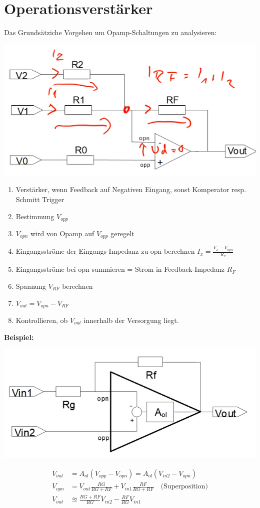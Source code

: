 \section{Operationsverstärker}
Das Grundsätziche Vorgehen um Opamp-Schaltungen zu analysieren:
\begin{center}
	\includegraphics[width=0.5\linewidth]{Images/opamp_todo}
\end{center}

\begin{enumerate}[nosep]
	\item Verstärker, wenn Feedback auf Negativen Eingang, sonst Komperator resp. Schmitt Trigger
	\item Bestimmung $V_{opp}$
	\item $V_{opn}$ wird von Opamp auf $V_{opp}$ geregelt
	\item Eingangsströme der Eingangs-Impedanz zu opn berechnen $I_x = \frac{V_x - V_{opn}}{R_x}$
	\item Eingangsströme bei opn summieren = Strom in Feedback-Impedanz $R_F$
	\item Spannung $V_{RF}$ berechnen
	\item $V_{out} = V_{opn} - V_{RF}$
	\item Kontrollieren, ob $V_{out}$ innerhalb der Versorgung liegt.
\end{enumerate}

\textbf{Beispiel:}\\
\begin{center}
	\includegraphics[width=0.6\columnwidth]{Images/screenshot001}
\end{center}
\begin{align*}
	V_{out} &= A_{ol}(V_{opp} - V_{opn}) = A_{ol}(V_{in2} - V_{opn}) \\
	V_{opn} &= V_{out}\frac{RG}{RG + RF} + V_{in1}\frac{RF}{RG + RF} \quad\text{(Superposition)} \\
		V_{out} &\approxeq \frac{RG + RF}{RG}V_{in2} - \frac{RF}{RG}V_{in1}
\end{align*}


